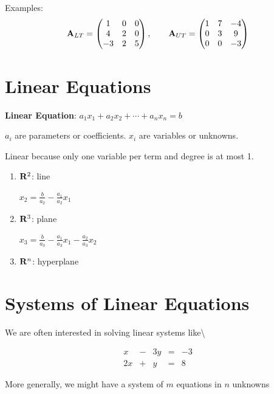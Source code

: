 \documentclass[]{book}
\theoremstyle{definition}
\theoremstyle{definition}
\theoremstyle{definition}
\theoremstyle{remark}
\begin{document}
Examples:
\[ {\bf A}_{LT}= \begin{pmatrix} 1&0 & 0\\4&2&0\\-3 & 2 & 5 \end{pmatrix}, \qquad {\bf A}_{UT}=\begin{pmatrix} 1&7&-4\\ 0&3&9\\
0&0&-3 \end{pmatrix}\]

\section{Linear Equations}\label{linear-equations}

\textbf{Linear Equation}: \(a_1 x_1 + a_2 x_2 + \cdots + a_n x_n = b\)

\(a_i\) are parameters or coefficients. \(x_i\) are variables or
unknowns.

Linear because only one variable per term and degree is at most 1.

\begin{enumerate} 
        \item \parbox[t]{1.5in}{${\bf R}^2$: line} $x_2 = \frac{b}{a_2}-\frac{a_1}{a_2} x_1$
        \item \parbox[t]{1.5in}{${\bf R}^3$: plane} $x_3= \frac{b}{a_3}-\frac{a_1}{a_3} x_1-\frac{a_2}{a_3} x_2 $
        \item ${\bf R}^n$: hyperplane
    \end{enumerate}

\section{Systems of Linear Equations}\label{systems-of-linear-equations}

We are often interested in solving linear systems like\textbackslash{}

\[\begin{matrix}
            x  & - & 3y & = & -3\\
            2x & + &  y & = &  8
            \end{matrix}\]

More generally, we might have a system of \(m\) equations in \(n\)
unknowns
\end{document}
